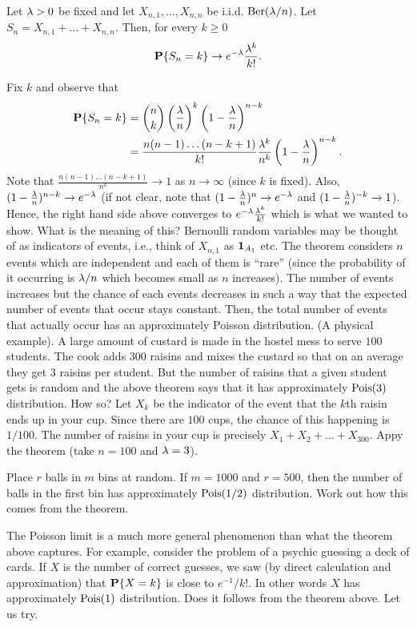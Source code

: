 \documentclass[preprint,  11pt]{amsart}
\begin{document}
\begin{theorem} Let $\lam>0$ be fixed and let $X_{n,1},\ldots ,X_{n,n}$ be i.i.d. $\mb{Ber}(\lam/n)$. Let $S_{n}=X_{n,1}+\ldots +X_{n,n}$. Then, for every $k\ge 0$
$$
\P\{S_{n}=k\}\to e^{-\lam}\frac{\lam^{k}}{k!}.
$$
\end{theorem}
\bprf Fix $k$ and observe that
\begin{align*}
\P\{S_{n}=k\} &= \binom{n}{k}\l(\frac{\lam}{n}\r)^{k}\l(1-\frac{\lam}{n}\r)^{n-k} \\
 &= \frac{n(n-1)\ldots (n-k+1)}{k!}\frac{\lam^{k}}{n^{k}}\l(1-\frac{\lam}{n}\r)^{n-k}.
 \end{align*}
Note that $\frac{n(n-1)\ldots(n-k+1)}{n^{k}}\to 1$ as $n\to \infty$ (since $k$ is fixed). Also, $(1-\frac{\lam}{n})^{n-k}\to e^{-\lam}$ (if not clear, note that $(1-\frac{\lam}{n})^{n}\to e^{-\lam}$ and $(1-\frac{\lam}{n})^{-k}\to 1$). Hence, the right hand side above converges to $e^{-\lam}\frac{\lam^{k}}{k!}$ which is what we wanted to show.
\eprf
What is the meaning of this? Bernoulli random variables may be thought of as indicators of events, i.e., think of $X_{n,1}$ as $\one_{A_{1}}$ etc. The theorem considers $n$ events which are independent and each of them is ``rare'' (since the probability of it occurring is $\lam/n$ which becomes small as $n$ increases). The number of events increases but the chance of each events decreases in such a way that the expected number of events that occur stays constant. Then, the total number of events that actually occur has an approximately Poisson distribution.
\beg (A physical example). A large amount of custard is made in the hostel mess to serve $100$ students. The cook adds $300$ raisins and mixes the custard so that on an average they get $3$ raisins per student. But the number of raisins that a given student gets is random and the above theorem says that it has approximately $\mb{Pois}(3)$ distribution. How so? Let $X_{k}$ be the indicator of the event that the $k$th raisin ends up in your cup. Since there are $100$ cups, the chance of this happening is $1/100$. The number of raisins in your cup is precisely $X_{1}+X_{2}+\ldots +X_{300}$. Appy the theorem (take $n=100$ and $\lam=3$).
\eeg

\beg Place $r$ balls in $m$ bins at random. If $m=1000$  and $r=500$, then the number of balls in the first bin has approximately $\mb{Pois}(1/2)$ distribution. Work out how this comes from the theorem.
\eeg

The Poisson limit is a much more general phenomenon than what the theorem above captures. For example, consider the problem of a psychic guessing a deck of cards. If $X$ is the number  of correct guesses, we saw (by direct calculation and approximation) that $\P\{X=k\}$ is close to $e^{-1}/k!$. In other words $X$ has approximately $\mb{Pois}(1)$ distribution. Does it follows from the theorem above. Let us try.
\end{document}
